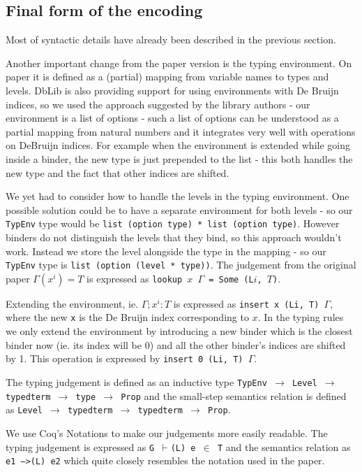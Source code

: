 \documentclass[runningheads]{article}
\begin{document}
\subsection{Final form of the encoding}
\label{finalformencoding}
Most of syntactic details have already been described in the previous section.

Another important change from the paper version is the typing environment. On paper it is defined as a (partial) mapping from variable names to types and levels.
DbLib is also providing support for using environments with De Bruijn indices, so we used the approach suggested by the library authors - our environment is a list of options - such a list of options can be understood as a partial mapping from natural numbers and it integrates very well with operations on DeBruijn indices. For example when the environment is extended while going inside a binder, the new type is just prepended to the list - this both handles the new type and the fact that other indices are shifted.

We yet had to consider how to handle the levels in the typing environment. One possible solution could be to have a separate environment for both levels - so our \texttt{TypEnv} type would be \texttt{list (option type) * list (option type)}. However binders do not distinguish the levels that they bind, so this approach wouldn't work. Instead we store the level alongside the type in the mapping - so our \texttt{TypEnv} type is \texttt{list (option (level * type))}. The judgement from the original paper $\Gamma(x^i) = T$ is expressed as \texttt{lookup $x$ $\Gamma$ = Some (L$i$, $T$)}.

Extending the environment, ie. $\Gamma; x^i : T$ is expressed as \verb|insert x (Li, T) |$\Gamma$, where the new \verb|x| is the De Bruijn index corresponding to $x$. In the typing rules we only extend the environment by introducing a new binder which is the closest binder now (ie. its index will be 0) and all the other binder's indices are shifted by 1. This operation is expressed by \verb|insert 0 (Li, T) |$\Gamma$.

The typing judgement is defined as an inductive type \texttt{TypEnv $\to$ Level $\to$ typedterm $\to$ type $\to$ Prop} and the small-step semantics relation is defined as \texttt{Level $\to$ typedterm $\to$ typedterm $\to$ Prop}. 

We use Coq's Notations to make our judgements more easily readable. The typing judgement is expressed as \texttt{G $\vdash$(L) e $\in$ T} and the semantics relation as \texttt{e1 -->(L) e2} which quite closely resembles the notation used in the paper.
\end{document}
